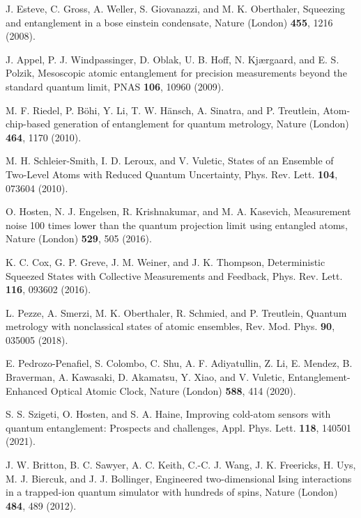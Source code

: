 \documentclass[pra,twocolumn,showpacs,preprintnumbers,amsmath,amssymb,superscriptaddress]{revtex4-1}
\begin{document}

\begin{thebibliography}{99}
			

 J.  Esteve,  C.  Gross,  A.  Weller,  S.  Giovanazzi,   and  M.  K.  Oberthaler, Squeezing and entanglement in a bose einstein condensate, Nature (London) {\bf 455}, 1216 (2008).

 J.   Appel,   P.   J.   Windpassinger,   D.   Oblak,   U.   B.   Hoff,   N.   Kj\ae rgaard, and  E.  S.  Polzik,  Mesoscopic  atomic  entanglement  for  precision  measurements  beyond  the  standard  quantum  limit,  PNAS {\bf 106},  10960 (2009).

  M. F. Riedel, P. B\"ohi, Y. Li, T. W. H\"ansch, A. Sinatra, and P. Treutlein, Atom-chip-based  generation  of  entanglement  for  quantum  metrology, Nature (London) {\bf 464}, 1170 (2010).

 M. H. Schleier-Smith, I. D. Leroux,  and V. Vuletic, States of an Ensemble of Two-Level Atoms with Reduced Quantum Uncertainty, Phys. Rev. Lett. {\bf 104}, 073604 (2010).

 O. Hosten, N. J. Engelsen, R. Krishnakumar, and M. A. Kasevich, Measurement noise 100 times lower than the quantum projection limit using entangled atoms, Nature (London) {\bf 529}, 505 (2016).

 K. C. Cox, G. P. Greve, J. M. Weiner,  and J. K. Thompson, Deterministic Squeezed States with Collective Measurements and Feedback, Phys. Rev. Lett. {\bf 116}, 093602 (2016).

 L.  Pezze,  A.  Smerzi,  M.  K.  Oberthaler,  R.  Schmied,   and  P.  Treutlein, Quantum metrology with nonclassical states of atomic ensembles,  Rev. Mod. Phys. {\bf 90}, 035005 (2018).

 E. Pedrozo-Penafiel, S. Colombo, C. Shu, A. F. Adiyatullin, Z. Li, E. Mendez, B. Braverman, A. Kawasaki, D. Akamatsu, Y. Xiao, and V. Vuletic, Entanglement-Enhanced Optical Atomic Clock, Nature (London) {\bf 588}, 414 (2020).

 S. S. Szigeti, O. Hosten, and S. A. Haine, Improving cold-atom sensors with quantum entanglement: Prospects and challenges, Appl. Phys. Lett. {\bf 118}, 140501 (2021).


 J. W. Britton, B. C. Sawyer, A. C. Keith, C.-C. J. Wang, J. K. Freericks, H. Uys, M. J. Biercuk, and J. J. Bollinger, Engineered two-dimensional Ising interactions in a trapped-ion quantum simulator with hundreds of spins, Nature (London) {\bf 484}, 489 (2012).


\end{thebibliography}
\end{document}
